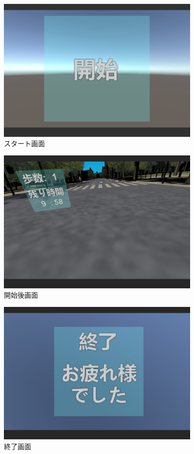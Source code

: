 \begin{figure}[tbp]
	\centering
			\includegraphics[width=0.9\textwidth]{chap2-figure/start.eps}
	\caption{スタート画面}
	\label{fig:start}
\end{figure}

\begin{figure}[tbp]
	\centering
			\includegraphics[width=0.9\textwidth]{chap2-figure/midstream-1.eps}
	\caption{開始後画面}
	\label{fig:gemestart}
\end{figure}

\begin{figure}[tbp]
	\centering
			\includegraphics[width=0.9\textwidth]{chap2-figure/end.eps}
	\caption{終了画面}
	\label{fig:end}
\end{figure}
\fi

